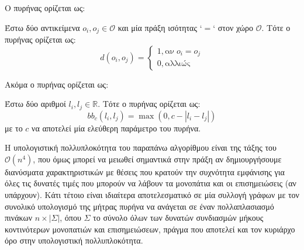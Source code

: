 Ο πυρήνας  ορίζεται ως:
\begin{definition}
	Έστω δύο αντικείμενα $o_{i}, ο_{j} \in \mathcal{O}$ και μία πράξη ισότητας `$=$` στον χώρο $\mathcal{O}$.
	Τότε ο πυρήνας  ορίζεται ως:
	$$
	d(o_{i}, o_{j}) =  \begin{cases}
	1, \text{αν} \;o_{i} = o_{j}\\
	0, \text{αλλιώς}
	\end{cases}
	$$
	\label{def:dirac}
\end{definition}
Ακόμα ο πυρήνας ορίζεται ως:
\begin{definition}
	Έστω δύο αριθμοί $l_{i}, l_{j} \in \mathbb{R}$.
	Τότε ο πυρήνας  ορίζεται ως:
    $$bb_{c}(l_{i}, l_{j}) = \max(0, c - |l_{i} - l_{j}|)$$
    με το $c$ να αποτελεί μία ελεύθερη παράμετρο του πυρήνα.
\end{definition}
Η υπολογιστική πολλυπλοκότητα του παραπάνω αλγορίθμου είναι της τάξης του $\mathcal{O}(n^4)$, που όμως μπορεί να μειωθεί σημαντικά στην πράξη αν δημιουργήσουμε διανύσματα χαρακτηριστικών με θέσεις που κρατούν την συχνότητα εμφάνισης για όλες τις δυνατές τιμές που μπορούν να λάβουν τα μονοπάτια και οι επισημειώσεις (αν υπάρχουν). Κάτι τέτοιο είναι ιδιαίτερα αποτελεσματικό σε μία συλλογή γράφων με τον συνολικό υπολογισμό της μήτρας πυρήνα να ανάγεται σε έναν πολλαπλασιασμό πινάκων $n \times |\Sigma|$, όπου $\Sigma$ το σύνολο όλων των δυνατών συνδιασμών μήκους κοντινότερων μονοπατιών και επισημειώσεων, πράγμα που αποτελεί και τον κυριάρχο όρο στην υπολογιστική πολλυπλοκότητα.


